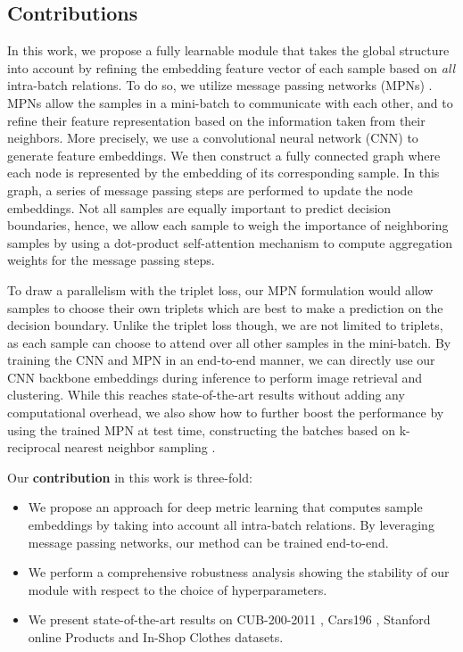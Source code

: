 \documentclass{article}
\begin{document}
\subsection{Contributions}

In this work, we propose a fully learnable module that takes the global structure into account by refining the embedding feature vector of each sample based on \textit{all} intra-batch relations.
To do so, we utilize message passing networks (MPNs) \cite{DBLP:conf/icml/GilmerSRVD17}. MPNs allow the samples in a mini-batch to communicate with each other, and to refine their feature representation based on the information taken from their neighbors. More precisely, we use a convolutional neural network (CNN) to generate feature embeddings. 
We then construct a fully connected graph where each node is represented by the embedding of its corresponding sample. 
In this graph, a series of message passing steps are performed to update the node embeddings. 
Not all samples are equally important to predict decision boundaries, hence, we allow each sample to weigh the importance of neighboring samples by using a dot-product self-attention mechanism to compute aggregation weights for the message passing steps.


To draw a parallelism with the triplet loss, our MPN formulation would allow samples to choose their own triplets which are best to make a prediction on the decision boundary. Unlike the triplet loss though, we are not limited to triplets, as each sample can choose to attend over all other samples in the mini-batch.
By training the CNN and MPN in an end-to-end manner, we can directly use our CNN backbone embeddings during inference to perform image retrieval and clustering.
While this reaches state-of-the-art results without adding any computational overhead, we also show how to further boost the performance by using the trained MPN at test time, constructing the batches based on k-reciprocal nearest neighbor sampling \cite{DBLP:conf/cvpr/ZhongZCL17}. 


Our \textbf{contribution} in this work is three-fold: 
\begin{itemize}
    \item We propose an approach for deep metric learning that computes sample embeddings by taking into account all intra-batch relations. By leveraging message passing networks, our method can be trained end-to-end.
    \item We perform a comprehensive robustness analysis showing the stability of our module with respect to the choice of hyperparameters.
    \item We present state-of-the-art results on CUB-200-2011 \cite{WahCUB_200_2011}, Cars196 \cite{KrauseStarkDengFei-Fei_3DRR2013}, Stanford online Products \cite{DBLP:conf/cvpr/SongXJS16} and In-Shop Clothes \cite{DBLP:conf/cvpr/LiuLQWT16} datasets. 
\end{itemize}
\end{document}
